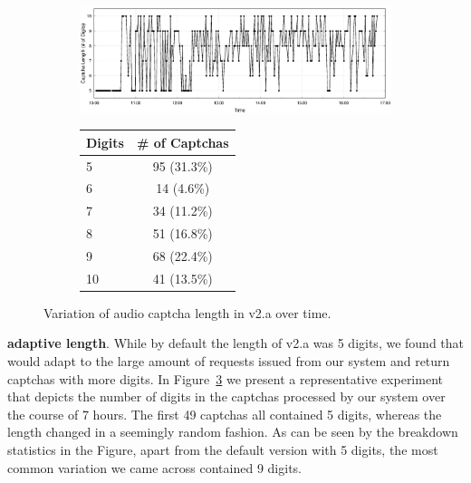 \begin{figure}[tp]
\begin{subfigure}{0.75\textwidth}
    \centering
    \includegraphics[width=1\textwidth]{figures/captcha_length.eps}
    \label{fig:length_time}
\end{subfigure} %
\begin{subfigure}{0.2\textwidth}
    \centering
    \label{tab:length}
    \begin{tabular}{lc}
    \toprule
    \textbf{Digits} & \textbf{\# of Captchas} \\
    \hline
    5 & 95 (31.3\%) \\
    \rowcolor{Gray} 
    6 & 14 (4.6\%) \\
    7 & 34 (11.2\%) \\
    \rowcolor{Gray} 
    8 & 51 (16.8\%) \\
    9 & 68 (22.4\%) \\
    \rowcolor{Gray} 
    10 & 41 (13.5\%)\\
    \bottomrule
    \end{tabular}
\end{subfigure}
\caption{Variation of audio captcha length in \re v2.a over time.}
\label{fig:length}
\end{figure}

\textbf{\re adaptive length}.
While by default the length of \re v2.a was 5 digits, we found %
that \re would adapt to the large amount of requests issued from our system and return captchas with more digits. 
In Figure~\ref{fig:length} we present a representative experiment that depicts the number of digits in the captchas
processed by our system over the course of 7 hours. The first 49 captchas all contained 5 digits, whereas the length
changed in a seemingly random fashion. As can be seen by the breakdown statistics in the Figure, apart from the default
version with 5 digits, the most common variation we came across contained 9 digits.

